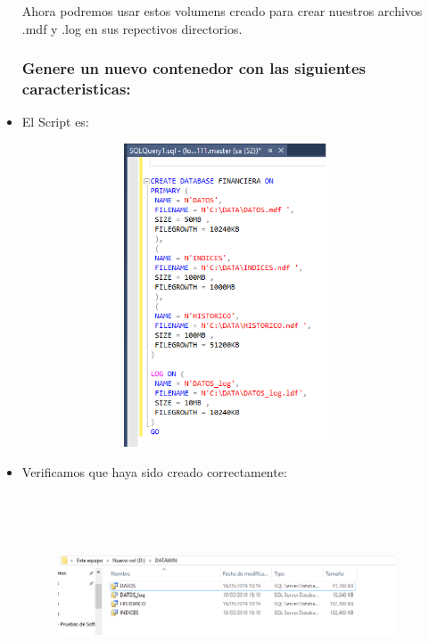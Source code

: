 \begin{itemize}
	Ahora podremos usar estos volumens creado para crear nuestros archivos .mdf y .log en sus repectivos directorios.
	\clearpage
	
	
	
	\subsubsection{Genere un nuevo contenedor con las siguientes caracteristicas:}
	
	\item El Script es:
	
	\begin{figure}[htb]
	\begin{center}
	\includegraphics[width=10cm, height=9cm]{./Imagenes/scriptq}
	\end{center}
	\end{figure}
	
	\item Verificamos que haya sido creado correctamente:
	
	\begin{figure}[htb]
	\begin{center}
	\includegraphics[width=10cm, height=6cm]{./Imagenes/scriptq2}
	\end{center}
	\end{figure}
	
	
	
	

\end{itemize}
